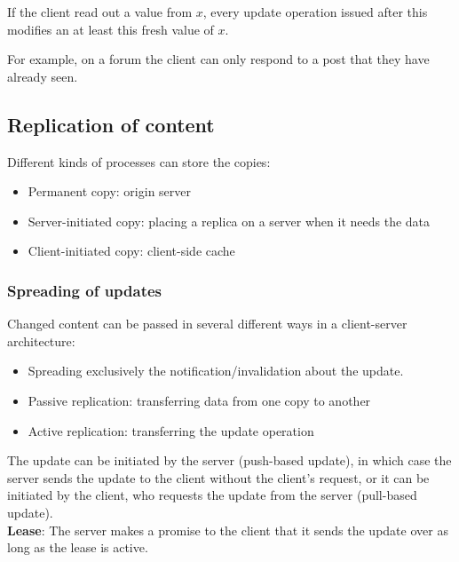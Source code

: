 \documentclass[margin=0px]{article}
\begin{document}
If the client read out a value from $x$, every update operation issued after this modifies an at least
this fresh value of $x$.

For example, on a forum the client can only respond to a post that they have already seen.

\subsection{Replication of content}

Different kinds of processes can store the copies:

\begin{itemize}
    \item	Permanent copy: origin server
    \item	Server-initiated copy: placing a replica on a server when it needs
          the data
    \item	Client-initiated copy: client-side cache
\end{itemize}

\subsubsection{Spreading of updates}
Changed content can be passed in several different ways in a client-server architecture:

\begin{itemize}
    \item	Spreading exclusively the notification/invalidation about the update.
    \item	Passive replication: transferring data from one copy to another
    \item	Active replication: transferring the update operation
\end{itemize}

The update can be initiated by the server (push-based update), in which case the server sends the update to the client without the client's request,
or it can be initiated by the client, who requests the update from the server (pull-based update).\\

\noindent \textbf{Lease}: The server makes a promise to the client that it sends the update over as long as the lease is active.
\end{document}
